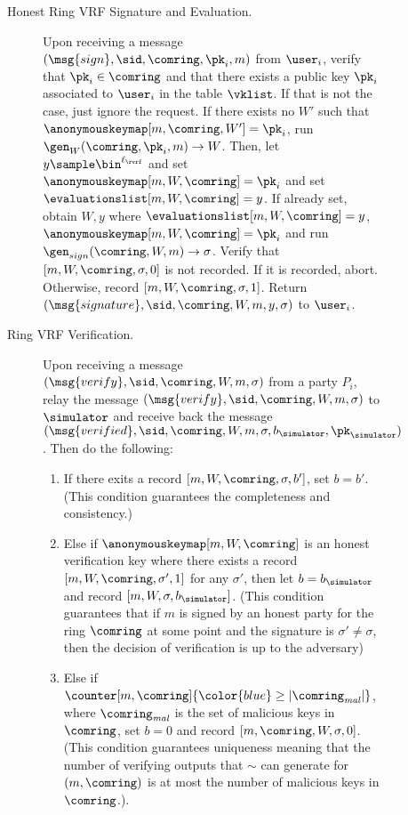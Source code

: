 \begin{figure}
\begin{tcolorbox}
{\begin{description}
		     	\item[Honest Ring VRF Signature {\color{blue}and Evaluation.}] Upon receiving a message $(\msg{sign}, \sid, \comring, \pk_i, m)$ from $\user_i$, verify that $\pk_i \in \comring$ and that there exists a public key $\pk_i$ associated to $\user_i$ in the table $ \vklist $. If that is not the case, just ignore the request. 	
				If there exists no $ W' $ such that $ \anonymouskeymap[m, \comring,W'] =  \pk_i $, run $ \gen_W(\comring, \pk_i, m) \rightarrow W$. Then, let $y \sample \bin^{\ell_\rvrf}$ and set $ \anonymouskeymap[m,W,\comring] = \pk_i $ and set $ \evaluationslist[m, W,\comring] = y$.
				If already set, obtain $ W, y $ where  $ \evaluationslist[m, W, \comring] = y$, $ \anonymouskeymap[m,W,\comring] =\pk_i $ and run  $ \gen_{sign}(\comring, W, m) \rightarrow \sigma $. Verify that $ [m, W,\comring, \sigma, 0] $ is not recorded. {\color{blue}If it is recorded}, abort. 
				Otherwise, record $ [m, W, \comring,\sigma, 1] $. Return $(\msg{signature}, \sid, \comring,W,m, y, \sigma)$ to $\user_i$.
				
				\item[Ring VRF Verification.] Upon receiving a message $(\msg{verify}, \sid, \comring,W, m, \sigma)$ from a party $P_i$, relay the message $(\msg{verify}, \sid, \comring,W, m, \sigma)$ to $ \simulator $ and receive back the message $(\msg{verified}, \sid, \comring,W, m, \sigma, b_{\simulator}, \pk_\simulator)$. Then do the following: 
				\begin{enumerate}[label={{Cond.-} }{{\arabic*}}, start = 1]
					\item If there exits a record $ [m,W,\comring,\sigma, b'] $, set $ b = b' $. (This condition guarantees the completeness and consistency.)
					\label{cond:consistency}
					\item Else if $ \anonymouskeymap[m,W,\comring]  $ is an honest verification key where  there exists a record $ [m, W,\comring, \sigma', 1] $ for any $ \sigma' $, then let $ b= b_{\simulator} $ and record $ [m, W,\sigma, b_{\simulator}] $. (This condition guarantees that if $ m $ is signed by an honest party for the ring $ \comring $ at some point and the signature is $ \sigma' \neq \sigma $, then the decision of verification is up to the adversary) \label{cond:differentsignature}
					
					\item Else if $\counter[m, \comring] {\color{blue}\geq |\comring_{\mathit{mal}}|}$, where {\color{blue} $\comring_{\mathit{mal}}$} is the set of {\color{blue} malicious} keys in $ \comring $, set $ b = 0 $ and record $ [m, \comring,W,\sigma, 0] $.
					(This condition guarantees  uniqueness meaning that the number of {\color{blue} verifying} outputs that $ \sim $ can generate for $(m, \comring)$ 
					is at most the  number of malicious keys in $ \comring $.)\label{cond:uniqueness}.
					

\end{enumerate}
\end{description}}
\end{tcolorbox}
\end{figure}
